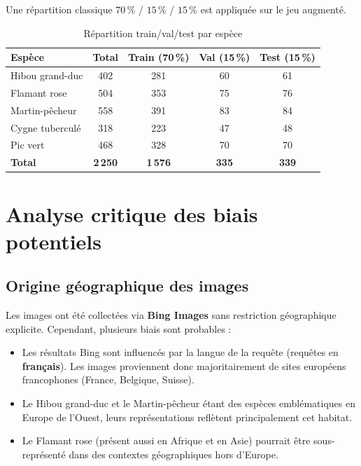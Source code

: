 \documentclass[12pt,a4paper]{article}
\begin{document}
Une répartition classique $70\,\%$ / $15\,\%$ / $15\,\%$ est appliquée sur le jeu augmenté.

\begin{table}[h!]
  \centering
  \caption{Répartition train/val/test par espèce}
  \label{tab:split}
  \begin{tabular}{lcccc}
    \toprule
    \textbf{Espèce} & \textbf{Total} & \textbf{Train (70\,\%)} & \textbf{Val (15\,\%)} & \textbf{Test (15\,\%)} \\
    \midrule
    Hibou grand-duc  &  402 &  281 &  60 &  61 \\
    Flamant rose     &  504 &  353 &  75 &  76 \\
    Martin-pêcheur   &  558 &  391 &  83 &  84 \\
    Cygne tuberculé  &  318 &  223 &  47 &  48 \\
    Pic vert         &  468 &  328 &  70 &  70 \\
    \midrule
    \textbf{Total}   & \textbf{2\,250} & \textbf{1\,576} & \textbf{335} & \textbf{339} \\
    \bottomrule
  \end{tabular}
\end{table}

\begin{center}
\end{center}

\section{Analyse critique des biais potentiels}

\subsection{Origine géographique des images}

Les images ont été collectées via \textbf{Bing Images} sans restriction géographique explicite. Cependant, plusieurs biais sont probables :

\begin{itemize}
  \item Les résultats Bing sont influencés par la langue de la requête (requêtes en \textbf{français}).
    Les images proviennent donc majoritairement de sites européens francophones (France, Belgique, Suisse).
  \item Le Hibou grand-duc et le Martin-pêcheur étant des espèces emblématiques en Europe de l'Ouest,
    leurs représentations reflètent principalement cet habitat.
  \item Le Flamant rose (présent aussi en Afrique et en Asie) pourrait être sous-représenté
    dans des contextes géographiques hors d'Europe.
\end{itemize}
\end{document}
